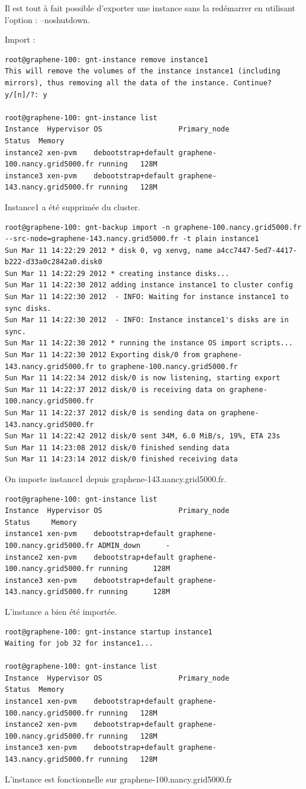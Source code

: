 Il est tout à fait possible d'exporter une instance sans la redémarrer en utilisant l'option : --noshutdown.

Import :
\begin{lstlisting}
root@graphene-100: gnt-instance remove instance1
This will remove the volumes of the instance instance1 (including
mirrors), thus removing all the data of the instance. Continue?
y/[n]/?: y

root@graphene-100: gnt-instance list
Instance  Hypervisor OS                  Primary_node                   Status  Memory
instance2 xen-pvm    debootstrap+default graphene-100.nancy.grid5000.fr running   128M
instance3 xen-pvm    debootstrap+default graphene-143.nancy.grid5000.fr running   128M
\end{lstlisting}
Instance1 a été supprimée du cluster.
\begin{lstlisting}
root@graphene-100: gnt-backup import -n graphene-100.nancy.grid5000.fr --src-node=graphene-143.nancy.grid5000.fr -t plain instance1
Sun Mar 11 14:22:29 2012 * disk 0, vg xenvg, name a4cc7447-5ed7-4417-b222-d33a0c2842a0.disk0
Sun Mar 11 14:22:29 2012 * creating instance disks...
Sun Mar 11 14:22:30 2012 adding instance instance1 to cluster config
Sun Mar 11 14:22:30 2012  - INFO: Waiting for instance instance1 to sync disks.
Sun Mar 11 14:22:30 2012  - INFO: Instance instance1's disks are in sync.
Sun Mar 11 14:22:30 2012 * running the instance OS import scripts...
Sun Mar 11 14:22:30 2012 Exporting disk/0 from graphene-143.nancy.grid5000.fr to graphene-100.nancy.grid5000.fr
Sun Mar 11 14:22:34 2012 disk/0 is now listening, starting export
Sun Mar 11 14:22:37 2012 disk/0 is receiving data on graphene-100.nancy.grid5000.fr
Sun Mar 11 14:22:37 2012 disk/0 is sending data on graphene-143.nancy.grid5000.fr
Sun Mar 11 14:22:42 2012 disk/0 sent 34M, 6.0 MiB/s, 19%, ETA 23s
Sun Mar 11 14:23:08 2012 disk/0 finished sending data
Sun Mar 11 14:23:14 2012 disk/0 finished receiving data
\end{lstlisting}
On importe instance1 depuis graphene-143.nancy.grid5000.fr.
\begin{lstlisting}
root@graphene-100: gnt-instance list
Instance  Hypervisor OS                  Primary_node                   Status     Memory
instance1 xen-pvm    debootstrap+default graphene-100.nancy.grid5000.fr ADMIN_down      -
instance2 xen-pvm    debootstrap+default graphene-100.nancy.grid5000.fr running      128M
instance3 xen-pvm    debootstrap+default graphene-143.nancy.grid5000.fr running      128M
\end{lstlisting}
L'instance a bien été importée.
\begin{lstlisting}
root@graphene-100: gnt-instance startup instance1
Waiting for job 32 for instance1...

root@graphene-100: gnt-instance list
Instance  Hypervisor OS                  Primary_node                   Status  Memory
instance1 xen-pvm    debootstrap+default graphene-100.nancy.grid5000.fr running   128M
instance2 xen-pvm    debootstrap+default graphene-100.nancy.grid5000.fr running   128M
instance3 xen-pvm    debootstrap+default graphene-143.nancy.grid5000.fr running   128M
\end{lstlisting}
L'instance est fonctionnelle sur graphene-100.nancy.grid5000.fr

